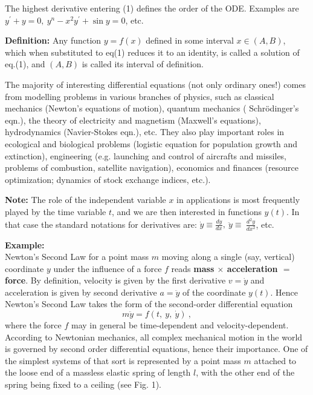 \documentclass[11pt,a4paper,twoside]{article}
\begin{document}
	The highest derivative entering (1) defines the order of the ODE. Examples are $y^\prime + y = 0,\ y^n -x^2y^\prime + \sin y = 0$, etc.\par
	\textbf{Definition:} Any function $y = f(x)$ defined in some interval $x \in (A, B)$, which when substituted to eq(1) reduces it to an identity, is called a solution of eq.(1), and $(A, B)$ is called its interval of definition.\par
	The majority of interesting differential equations (not only ordinary ones!) comes from modelling problems in various branches of physics, such as classical mechanics (Newton’s equations of motion), quantum mechanics ( Schr\"odinger’s eqn.), the theory of electricity and magnetism (Maxwell’s equations), hydrodynamics (Navier-Stokes eqn.), etc. They also play important roles in ecological and biological problems (logistic equation for population growth and extinction), engineering (e.g. launching and control of aircrafts and missiles, problems of combustion, satellite navigation), economics and finances (resource optimization; dynamics of stock exchange indices, etc.).\par
	\textbf{Note:} The role of the independent variable $x$ in applications is most frequently played by the time variable $t$, and we are then interested in functions $y(t)$. In that case the standard notations for derivatives are: $ \dot{y} \equiv \frac{dy}{dx},\ \ddot{y} \equiv \ \frac{d^2y}{dx^2} $, etc.\par
	\textbf{Example:}\\
	Newton’s Second Law for a point mass $m$ moving along a single (say, vertical) coordinate $y$ under the influence of a force $f$ reads \textbf{mass $\times$ acceleration $=$ force}. By definition, velocity is given by the first derivative $v = \dot{y}$ and acceleration is given by second derivative $a = \ddot{y}$ of the coordinate $y(t)$. Hence Newton’s Second Law takes the form of the second-order differential equation
	\begin{equation}
		m\ddot{y} = f(t,\ y,\ \dot{y})\ ,
	\end{equation}
	where the force $f$ may in general be time-dependent and velocity-dependent. According to
	Newtonian mechanics, all complex mechanical motion in the world is governed by second
	order differential equations, hence their importance. One of the simplest systems of that
	sort is represented by a point mass $m$ attached to the loose end of a massless elastic spring of length $l$, with the other end of the spring being fixed to a ceiling (see Fig. 1).
\end{document}
